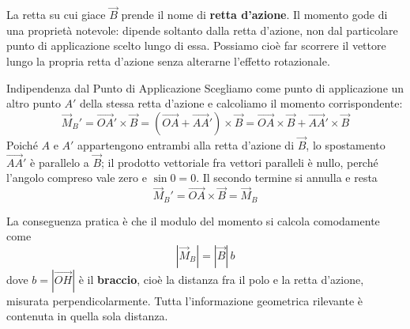 La retta su cui giace $\vec{B}$ prende il nome di \textbf{retta d'azione}. Il momento gode di una proprietà notevole: dipende soltanto dalla retta d'azione, non dal particolare punto di applicazione scelto lungo di essa. Possiamo cioè far scorrere il vettore lungo la propria retta d'azione senza alterarne l'effetto rotazionale.

\begin{osservazione}{Indipendenza dal Punto di Applicazione}
Scegliamo come punto di applicazione un altro punto $A'$ della stessa retta d'azione e calcoliamo il momento corrispondente:
\begin{equation}
    \vec{M}_B' = \vec{OA}' \times \vec{B}
    = (\vec{OA} + \vec{AA}') \times \vec{B}
    = \vec{OA} \times \vec{B} + \vec{AA}' \times \vec{B}
\end{equation}
Poiché $A$ e $A'$ appartengono entrambi alla retta d'azione di $\vec{B}$, lo spostamento $\vec{AA}'$ è parallelo a $\vec{B}$; il prodotto vettoriale fra vettori paralleli è nullo, perché l'angolo compreso vale zero e $\sin 0 = 0$. Il secondo termine si annulla e resta
\begin{equation}
    \vec{M}_B' = \vec{OA} \times \vec{B} = \vec{M}_B
\end{equation}
\end{osservazione}

La conseguenza pratica è che il modulo del momento si calcola comodamente come
\begin{equation}
    |\vec{M}_B| = |\vec{B}| \, b
\end{equation}
dove $b = |\vec{OH}|$ è il \textbf{braccio}, cioè la distanza fra il polo e la retta d'azione, misurata perpendicolarmente. Tutta l'informazione geometrica rilevante è contenuta in quella sola distanza.

